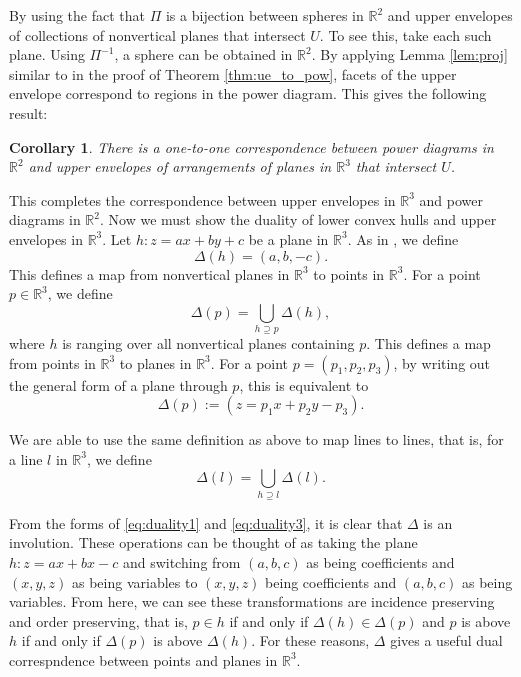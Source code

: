 \documentclass[a4paper, 11pt]{article}
\newtheorem{corollary}{Corollary}[section]
\newcommand{\R}{\mathbb{R}}
\begin{document}
By using the fact that $\Pi$ is a bijection between spheres in $\R^2$ and upper envelopes of collections of nonvertical planes that intersect $U$. To
see this, take each such plane. Using $\Pi^{-1}$, a sphere can be obtained in $\R^2$. By applying Lemma \ref{lem:proj} similar to in the proof of
Theorem \ref{thm:ue_to_pow}, facets of the upper envelope correspond to regions in the power diagram. This gives the following result:

\begin{corollary}
  There is a one-to-one correspondence between power diagrams in $\R^2$ and upper envelopes of arrangements of planes in $\R^3$ that intersect $U$.
  \label{cor:ue_pow}
\end{corollary}

This completes the correspondence between upper envelopes in $\R^3$ and power diagrams in $\R^2$. Now we must show the duality of lower convex hulls
and upper envelopes in $\R^3$. Let $h: z = ax + by + c$ be a plane in $\R^3$. As in \cite{aurenhammer_power}, we define
\begin{equation}
  \Delta(h) = \left( a, b, -c \right).
  \label{eq:duality1}
\end{equation}
This defines a map from nonvertical planes in $\R^3$ to points in $\R^3$. For a point $p \in \R^3$, we define
\begin{equation}
  \Delta(p) = \bigcup_{h \supseteq p} \Delta(h),
  \label{eq:duality2}
\end{equation}
where $h$ is ranging over all nonvertical planes containing $p$. This defines a map from points in $\R^3$ to planes in $\R^3$. For a point $p = (p_1, p_2, p_3)$,
by writing out the general form of a plane through $p$, this is equivalent to
\begin{equation}
  \Delta(p) := (z = p_1 x + p_2 y - p_3).
  \label{eq:duality3}
\end{equation}

We are able to use the same definition as above to map lines to lines, that is, for a line $l$ in $\R^3$, we define
\begin{equation}
  \Delta(l) = \bigcup_{h \supseteq l} \Delta(l).
  \label{eq:duality4}
\end{equation}

From the forms of \eqref{eq:duality1} and \eqref{eq:duality3}, it is clear that $\Delta$ is an involution. These operations can be thought of as
taking the plane $h: z = ax + bx - c$ and switching from $(a,b,c)$ as being coefficients and $(x,y,z)$ as being variables to $(x,y,z)$ being
coefficients and $(a,b,c)$ as being variables. From here, we can see these transformations are incidence preserving and order preserving, that is, $p \in h$ if and only if
$\Delta(h) \in \Delta(p)$ and $p$ is above $h$ if and only if $\Delta(p)$ is above $\Delta(h)$. For these reasons, $\Delta$ gives a useful dual
correspndence between points and planes in $\R^3$.
\end{document}
